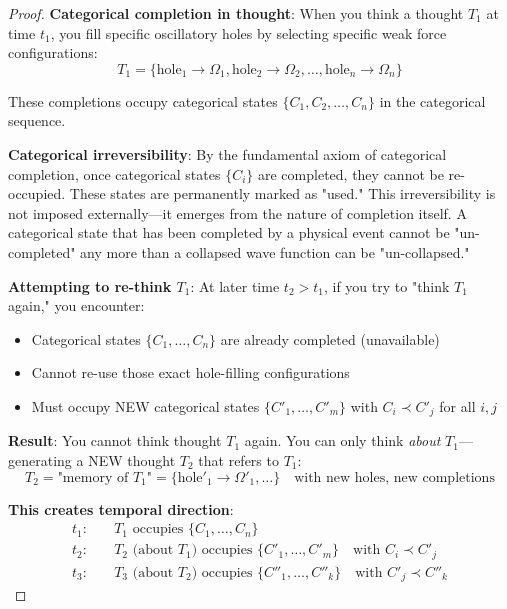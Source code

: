 \documentclass[11pt,a4paper]{article}
\begin{document}
\begin{proof}
\textbf{Categorical completion in thought}: When you think a thought $T_1$ at time $t_1$, you fill specific oscillatory holes by selecting specific weak force configurations:
\begin{equation}
T_1 = \{\text{hole}_1 \to \Omega_1, \text{hole}_2 \to \Omega_2, \ldots, \text{hole}_n \to \Omega_n\}
\end{equation}

These completions occupy categorical states $\{C_1, C_2, \ldots, C_n\}$ in the categorical sequence.

\textbf{Categorical irreversibility}: By the fundamental axiom of categorical completion, once categorical states $\{C_i\}$ are completed, they cannot be re-occupied. These states are permanently marked as "used." This irreversibility is not imposed externally—it emerges from the nature of completion itself. A categorical state that has been completed by a physical event cannot be "un-completed" any more than a collapsed wave function can be "un-collapsed."

\textbf{Attempting to re-think $T_1$}: At later time $t_2 > t_1$, if you try to "think $T_1$ again," you encounter:
\begin{itemize}
\item Categorical states $\{C_1, \ldots, C_n\}$ are already completed (unavailable)
\item Cannot re-use those exact hole-filling configurations
\item Must occupy NEW categorical states $\{C'_1, \ldots, C'_m\}$ with $C_i \prec C'_j$ for all $i,j$
\end{itemize}

\textbf{Result}: You cannot think thought $T_1$ again. You can only think \textit{about} $T_1$—generating a NEW thought $T_2$ that refers to $T_1$:
\begin{equation}
T_2 = \text{"memory of } T_1\text{"} = \{\text{hole}'_1 \to \Omega'_1, \ldots\} \quad \text{with new holes, new completions}
\end{equation}

\textbf{This creates temporal direction}:
\begin{align}
t_1: \quad &T_1 \text{ occupies } \{C_1, \ldots, C_n\} \\
t_2: \quad &T_2 \text{ (about } T_1\text{) occupies } \{C'_1, \ldots, C'_m\} \quad \text{with } C_i \prec C'_j \\
t_3: \quad &T_3 \text{ (about } T_2\text{) occupies } \{C''_1, \ldots, C''_k\} \quad \text{with } C'_j \prec C''_k
\end{align}


\end{proof}
\end{document}
